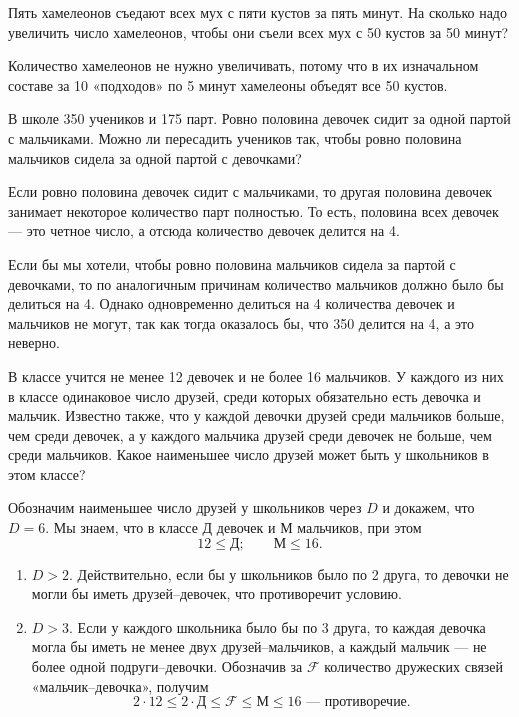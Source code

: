 \begin{itemize}

	\itA Пять хамелеонов съедают всех мух с пяти кустов за пять минут. На сколько надо увеличить число хамелеонов, чтобы они съели всех мух с 50 кустов за 50 минут?
	
	\itr Количество хамелеонов не нужно увеличивать, потому что в их изначальном составе за 10 «подходов» по 5 минут хамелеоны объедят все 50 кустов.
	
	\itB В школе 350 учеников и 175 парт. Ровно половина девочек сидит за одной партой с мальчиками. Можно ли пересадить учеников так, чтобы ровно половина мальчиков сидела за одной партой с девочками?
	
	\itr Если ровно половина девочек сидит с мальчиками, то другая половина девочек занимает некоторое количество парт полностью. То есть, половина всех девочек — это четное число, а отсюда количество девочек делится на 4.
	
	Если бы мы хотели, чтобы ровно половина мальчиков сидела за партой с девочками, то по аналогичным причинам количество мальчиков должно было бы делиться на 4. Однако одновременно делиться на 4 количества девочек и мальчиков не могут, так как тогда оказалось бы, что 350 делится на 4, а это неверно.
	
	\itC В классе учится не менее 12 девочек и не более 16 мальчиков. У каждого из них в классе одинаковое число друзей, среди которых обязательно есть девочка и мальчик. Известно также, что у каждой девочки друзей среди мальчиков больше, чем среди девочек, а у каждого мальчика друзей среди девочек не больше, чем среди мальчиков. Какое наименьшее число друзей может быть у школьников в этом классе?
	
	\def\grl{\text{Д}} \def\mal{\text{М}} \def\frnd{\mathcal F}
	\itr Обозначим наименьшее число друзей у школьников через $D$ и докажем, что $D=6$. Мы знаем, что в классе $\grl$ девочек и $\mal$ мальчиков, при этом
	$$12 \le \grl;\qquad \mal \le 16.$$
	
	\begin{enumerate}[label=\arabic*)]
		\item $D>2$. Действительно, если бы у школьников было по 2 друга, то девочки не могли бы иметь друзей–девочек, что противоречит условию.
		
		\item $D>3$. Если у каждого школьника было бы по 3 друга, то каждая девочка могла бы иметь не менее двух друзей–мальчиков, а каждый мальчик — не более одной подруги–девочки. Обозначив за $\frnd$ количество дружеских связей «мальчик–девочка», получим
		\vspace{-0.3cm}
		$$2\cdot 12 \le 2\cdot\grl \le \frnd \le \mal \le 16
			\text{ — противоречие.}$$
		

\end{enumerate}
\end{itemize}
